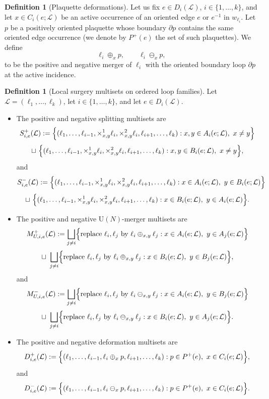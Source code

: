 \documentclass[11pt,a4paper,reqno]{article}
\theoremstyle{definition}
\newtheorem{definition}[theorem]{Definition}
\theoremstyle{remark}
\newcommand\U{{\mathrm U}}
\newcommand\Lc{{\mathcal{L}}}
\begin{document}
\begin{definition}[Plaquette deformations]
Let us fix $e\in D_i(\Lc)$, $i\in\{1,\dots,k\}$, and let $x\in C_i(e;\Lc)$ be an active occurrence of an oriented edge $e$ or $e^{-1}$ in $w_{\ell_i}$. Let $p$ be a positively oriented plaquette whose boundary $\partial p$ contains the same oriented edge occurrence (we denote by $P^+(e)$ the set of such plaquettes). We define
\[
\ell_i\oplus_x p,\qquad \ell_i\ominus_x p,
\]
to be the positive and negative merger of $\ell_i$ with the oriented boundary loop $\partial p$ at the active incidence.
\end{definition}

\begin{definition}[Local surgery multisets on ordered loop families]
Let $\Lc=(\ell_1,\dots,\ell_k)$, let $i\in\{1,\dots,k\}$, and let $e\in D_i(\Lc)$.

\begin{itemize}
\item The positive and negative splitting multisets are
\[
S^+_{i,e}(\Lc):=\Bigl\{(\ell_1,\dots,\ell_{i-1},\times^1_{x,y}\ell_i,\times^2_{x,y}\ell_i,\ell_{i+1},\dots,\ell_k):x,y\in A_i(e;\Lc),\ x\neq y\Bigr\}
\]
\[
\sqcup\ \Bigl\{(\ell_1,\dots,\ell_{i-1},\times^1_{x,y}\ell_i,\times^2_{x,y}\ell_i,\ell_{i+1},\dots,\ell_k):x,y\in B_i(e;\Lc),\ x\neq y\Bigr\},
\]
and
\[
S^-_{i,e}(\Lc):=\Bigl\{(\ell_1,\dots,\ell_{i-1},\times^1_{x,y}\ell_i,\times^2_{x,y}\ell_i,\ell_{i+1},\dots,\ell_k):x\in A_i(e;\Lc),\ y\in B_i(e;\Lc)\Bigr\}
\]
\[
\sqcup\ \Bigl\{(\ell_1,\dots,\ell_{i-1},\times^1_{x,y}\ell_i,\times^2_{x,y}\ell_i,\ell_{i+1},\dots,\ell_k):x\in B_i(e;\Lc),\ y\in A_i(e;\Lc)\Bigr\}.
\]

\item The positive and negative $\U(N)$-merger multisets are
\[
M^+_{U,i,e}(\Lc):=\bigsqcup_{j\neq i}\Bigl\{\text{replace }\ell_i,\ell_j\text{ by }\ell_i\oplus_{x,y}\ell_j:x\in A_i(e;\Lc),\ y\in A_j(e;\Lc)\Bigr\}
\]
\[
\sqcup\ \bigsqcup_{j\neq i}\Bigl\{\text{replace }\ell_i,\ell_j\text{ by }\ell_i\oplus_{x,y}\ell_j:x\in B_i(e;\Lc),\ y\in B_j(e;\Lc)\Bigr\},
\]
and
\[
M^-_{U,i,e}(\Lc):=\bigsqcup_{j\neq i}\Bigl\{\text{replace }\ell_i,\ell_j\text{ by }\ell_i\ominus_{x,y}\ell_j:x\in A_i(e;\Lc),\ y\in B_j(e;\Lc)\Bigr\}
\]
\[
\sqcup\ \bigsqcup_{j\neq i}\Bigl\{\text{replace }\ell_i,\ell_j\text{ by }\ell_i\ominus_{x,y}\ell_j:x\in B_i(e;\Lc),\ y\in A_j(e;\Lc)\Bigr\}.
\]

\item The positive and negative deformation multisets are
\[
D^+_{i,e}(\Lc):=\Bigl\{(\ell_1,\dots,\ell_{i-1},\ell_i\oplus_x p,\ell_{i+1},\dots,\ell_k):p\in P^+(e),\ x\in C_i(e;\Lc)\Bigr\},
\]
and
\[
D^-_{i,e}(\Lc):=\Bigl\{(\ell_1,\dots,\ell_{i-1},\ell_i\ominus_x p,\ell_{i+1},\dots,\ell_k):p\in P^+(e),\ x\in C_i(e;\Lc)\Bigr\}.
\]
\end{itemize}
\end{definition}
\end{document}
